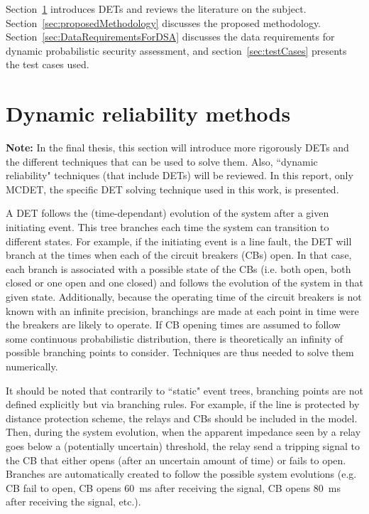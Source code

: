 Section~\ref{sec:dynamicReliability} introduces DETs and reviews the literature on the subject. Section~\ref{sec:proposedMethodology} discusses the proposed methodology. Section~\ref{sec:DataRequirementsForDSA} discusses the data requirements for dynamic probabilistic security assessment, and section~\ref{sec:testCases} presents the test cases used.


\section{Dynamic reliability methods}
\label{sec:dynamicReliability}

\textbf{Note:} In the final thesis, this section will introduce more rigorously DETs and the different techniques that can be used to solve them. Also, ``dynamic reliability" techniques (that include DETs) will be reviewed. In this report, only MCDET, the specific DET solving technique used in this work, is presented.

A DET follows the (time-dependant) evolution of the system after a given initiating event. This tree branches each time the system can transition to different states. For example, if the initiating event is a line fault, the DET will branch at the times when each of the circuit breakers (CBs) open. In that case, each branch is associated with a possible state of the CBs (i.e. both open, both closed or one open and one closed) and follows the evolution of the system in that given state. Additionally, because the operating time of the circuit breakers is not known with an infinite precision, branchings are made at each point in time were the breakers are likely to operate. If CB opening times are assumed to follow some continuous probabilistic distribution, there is theoretically an infinity of possible branching points to consider. Techniques are thus needed to solve them numerically.

It should be noted that contrarily to ``static" event trees, branching points are not defined explicitly but via branching rules. For example, if the line is protected by distance protection scheme, the relays and CBs should be included in the model. Then, during the system evolution, when the apparent impedance seen by a relay goes below a (potentially uncertain) threshold, the relay send a tripping signal to the CB that either opens (after an uncertain amount of time) or fails to open. Branches are automatically created to follow the possible system evolutions (e.g. CB fail to open, CB opens 60~ms after receiving the signal, CB opens 80~ms after receiving the signal, etc.).

